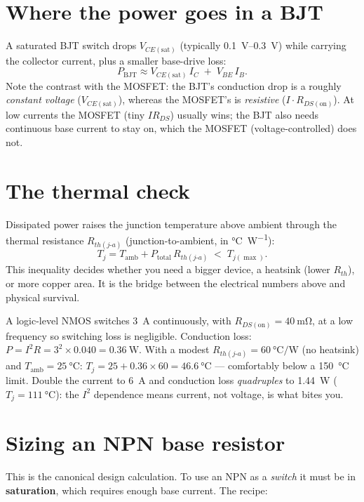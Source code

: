 \documentclass[11pt,a4paper,oneside]{book}
\begin{document}
\section{Where the power goes in a BJT}
A saturated BJT switch drops $V_{CE(\text{sat})}$ (typically
\qtyrange{0.1}{0.3}{\volt}) while carrying the collector current, plus a smaller
base-drive loss:
\[
   P_{\text{BJT}} \approx V_{CE(\text{sat})}\,I_C \;+\; V_{BE}\,I_B.
\]
Note the contrast with the MOSFET: the BJT's conduction drop is a roughly
\emph{constant voltage} ($V_{CE(\text{sat})}$), whereas the MOSFET's is
\emph{resistive} ($I\cdot R_{DS(\text{on})}$). At low currents the MOSFET (tiny
$I R_{DS}$) usually wins; the BJT also needs continuous base current to stay on,
which the MOSFET (voltage-controlled) does not.

\section{The thermal check}
Dissipated power raises the junction temperature above ambient through the
thermal resistance $R_{th(j\text{-}a)}$ (junction-to-ambient,
in \si{\celsius\per\watt}):
\[
   T_j = T_{\text{amb}} + P_{\text{total}}\,R_{th(j\text{-}a)}
   \;<\; T_{j(\max)}.
\]
This inequality decides whether you need a bigger device, a heatsink (lower
$R_{th}$), or more copper area. It is the bridge between the electrical numbers
above and physical survival.

\begin{wexample}
A logic-level NMOS switches \qty{3}{\ampere} continuously, with
$R_{DS(\text{on})}=\qty{40}{\milli\ohm}$, at a low frequency so switching loss is
negligible. Conduction loss:
$P = I^2 R = 3^2 \times 0.040 = \qty{0.36}{\watt}$. With a modest
$R_{th(j\text{-}a)}=\qty{60}{\celsius\per\watt}$ (no heatsink) and
$T_{\text{amb}}=\qty{25}{\celsius}$:
$T_j = 25 + 0.36\times 60 = \qty{46.6}{\celsius}$ --- comfortably below a
\qty{150}{\celsius} limit. Double the current to \qty{6}{\ampere} and conduction
loss \emph{quadruples} to \qty{1.44}{\watt} ($T_j=\qty{111}{\celsius}$): the
$I^2$ dependence means current, not voltage, is what bites you.
\end{wexample}

\section{Sizing an NPN base resistor}
This is the canonical design calculation. To use an NPN as a \emph{switch} it
must be in \textbf{saturation}, which requires enough base current. The recipe:
\end{document}
